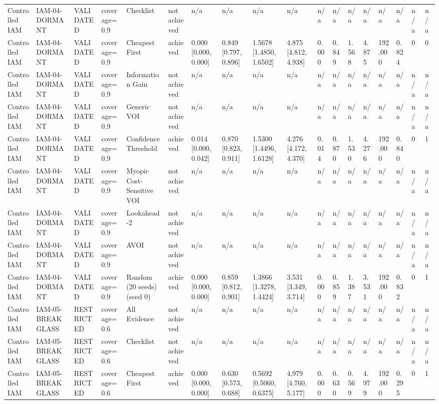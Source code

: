 \begin{table}[!ht]
{\begin{tabular}{llllllllllllllllll}
Controlled IAM & IAM-04-DORMANT & VALIDATED & coverage=0.9 & Checklist & not achieved & n/a & n/a & n/a & n/a & n/a & n/a & n/a & n/a & n/a & n/a & n/a & n/a \\
Controlled IAM & IAM-04-DORMANT & VALIDATED & coverage=0.9 & Cheapest First & achieved & 0.000 [0.000, 0.000] & 0.849 [0.797, 0.896] & 1.5678 [1.4850, 1.6502] & 4.875 [4.812, 4.938] & 0.000 & 0.849 & 1.568 & 4.875 & 192.000 & 0.824 & 0 & 0 \\
Controlled IAM & IAM-04-DORMANT & VALIDATED & coverage=0.9 & Information Gain & not achieved & n/a & n/a & n/a & n/a & n/a & n/a & n/a & n/a & n/a & n/a & n/a & n/a \\
Controlled IAM & IAM-04-DORMANT & VALIDATED & coverage=0.9 & Generic VOI & not achieved & n/a & n/a & n/a & n/a & n/a & n/a & n/a & n/a & n/a & n/a & n/a & n/a \\
Controlled IAM & IAM-04-DORMANT & VALIDATED & coverage=0.9 & Confidence Threshold & achieved & 0.014 [0.000, 0.042] & 0.870 [0.823, 0.911] & 1.5300 [1.4496, 1.6128] & 4.276 [4.172, 4.370] & 0.014 & 0.870 & 1.530 & 4.276 & 192.000 & 0.840 & 0 & 1 \\
Controlled IAM & IAM-04-DORMANT & VALIDATED & coverage=0.9 & Myopic Cost-Sensitive VOI & not achieved & n/a & n/a & n/a & n/a & n/a & n/a & n/a & n/a & n/a & n/a & n/a & n/a \\
Controlled IAM & IAM-04-DORMANT & VALIDATED & coverage=0.9 & Lookahead-2 & not achieved & n/a & n/a & n/a & n/a & n/a & n/a & n/a & n/a & n/a & n/a & n/a & n/a \\
Controlled IAM & IAM-04-DORMANT & VALIDATED & coverage=0.9 & AVOI & not achieved & n/a & n/a & n/a & n/a & n/a & n/a & n/a & n/a & n/a & n/a & n/a & n/a \\
Controlled IAM & IAM-04-DORMANT & VALIDATED & coverage=0.9 & Random (20 seeds) (seed 0) & achieved & 0.000 [0.000, 0.000] & 0.859 [0.812, 0.901] & 1.3866 [1.3278, 1.4424] & 3.531 [3.349, 3.714] & 0.000 & 0.859 & 1.387 & 3.531 & 192.000 & 0.832 & 0 & 1 \\
Controlled IAM & IAM-05-BREAKGLASS & RESTRICTED & coverage=0.6 & All Evidence & not achieved & n/a & n/a & n/a & n/a & n/a & n/a & n/a & n/a & n/a & n/a & n/a & n/a \\
Controlled IAM & IAM-05-BREAKGLASS & RESTRICTED & coverage=0.6 & Checklist & not achieved & n/a & n/a & n/a & n/a & n/a & n/a & n/a & n/a & n/a & n/a & n/a & n/a \\
Controlled IAM & IAM-05-BREAKGLASS & RESTRICTED & coverage=0.6 & Cheapest First & achieved & 0.000 [0.000, 0.000] & 0.630 [0.573, 0.688] & 0.5692 [0.5060, 0.6375] & 4.979 [4.760, 5.177] & 0.000 & 0.630 & 0.569 & 4.979 & 192.000 & 0.295 & 0 & 1 \\

\end{tabular}}
\end{table}
